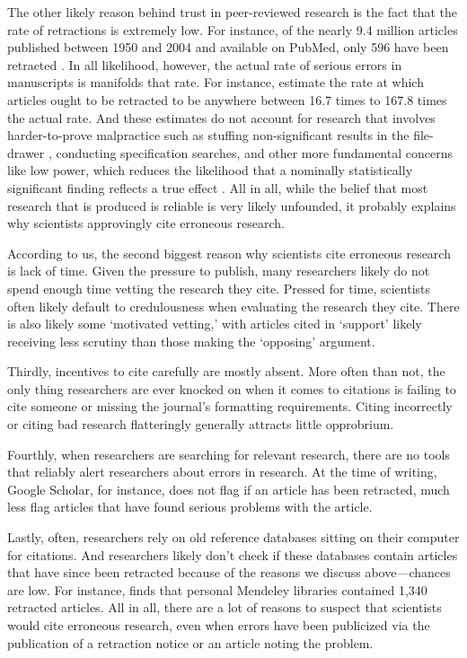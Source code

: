 \documentclass[12pt, letterpaper]{article}
\begin{document}
The other likely reason behind trust in peer-reviewed research is the fact that the rate of retractions is extremely low. For instance, of the nearly 9.4 million articles published between 1950 and 2004 and available on PubMed, only 596 have been retracted \citep{cokol2007many}. In all likelihood, however, the actual rate of serious errors in manuscripts is manifolds that rate. For instance, \citet{cokol2007many} estimate the rate at which articles ought to be retracted to be anywhere between 16.7 times to 167.8 times the actual rate. And these estimates do not account for research that involves harder-to-prove malpractice such as stuffing non-significant results in the file-drawer \citep{franco2014publication}, conducting specification searches, and other more fundamental concerns like low power, which reduces the likelihood that a nominally statistically significant finding reflects a true effect \citep{button2013power, ioannidis2005most}. All in all, while the belief that most research that is produced is reliable is very likely unfounded, it probably explains why scientists approvingly cite erroneous research. 

According to us, the second biggest reason why scientists cite erroneous research is lack of time. Given the pressure to publish, many researchers likely do not spend enough time vetting the research they cite. Pressed for time, scientists often likely default to credulousness when evaluating the research they cite. There is also likely some `motivated vetting,' with articles cited in `support' likely receiving less scrutiny than those making the `opposing' argument. 

Thirdly, incentives to cite carefully are mostly absent. More often than not, the only thing researchers are ever knocked on when it comes to citations is failing to cite someone or missing the journal's formatting requirements. Citing incorrectly or citing bad research flatteringly generally attracts little opprobrium.  

Fourthly, when researchers are searching for relevant research, there are no tools that reliably alert researchers about errors in research. At the time of writing, Google Scholar, for instance, does not flag if an article has been retracted, much less flag articles that have found serious problems with the article.

Lastly, often, researchers rely on old reference databases sitting on their computer for citations. And researchers likely don't check if these databases contain articles that have since been retracted because of the reasons we discuss above---chances are low. For instance, \citet{davis2012persistence} finds that personal Mendeley libraries contained 1,340 retracted articles. All in all, there are a lot of reasons to suspect that scientists would cite erroneous research, even when errors have been publicized via the publication of a retraction notice or an article noting the problem.
\end{document}
